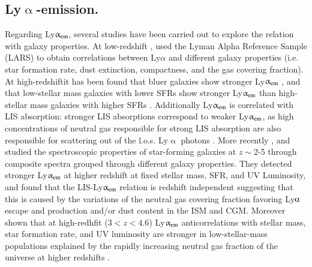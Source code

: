 \documentclass[longauth]{aa}
\begin{document}
\subsection{Ly$\upalpha$-emission.}

Regarding Ly$\upalpha_{\rm{em}}$, several studies have been carried out to
explore the relation with galaxy properties. At low-redshift \cite
{Runnholm20}, used the Lyman Alpha Reference Sample (LARS) to obtain
correlations between Ly$\alpha$ and different galaxy properties (i.e. star
formation rate, dust extinction, compactness, and the gas covering fraction).
At high-redshiftit has been found that bluer galaxies show stronger
Ly$\upalpha_{\rm{em}}$
\citep{Shapley03,Pentericci10,Berry12,Erb16}, and that low-stellar mass
galaxies with lower SFRs show stronger Ly$\upalpha_{\rm{em}}$ than
high-stellar mass galaxies with higher SFRs \citep
{Vanzella09,Stark10,Erb06a,Jones12,Shapley03,Kornei10,Hathi16}. Additionally
Ly$\upalpha_{\rm{em}}$ is correlated with LIS absorption: stronger LIS
absorptions correspond to weaker Ly$\upalpha_{\rm{em}}$, as high
concentrations of neutral gas responsible for strong LIS absorption are also
responsible for scattering out of the l.o.s. Ly$\upalpha$ photons \citep
{Shapley03,Vanzella09,Jones12}. More recently \cite{Du18},
\citep{Trainor19} and \cite{Pahl20} studied the spectroscopic properties of
star-forming galaxies at $z\sim$2-5 through composite spectra grouped
through different galaxy properties. They detected stronger Ly$\upalpha_{\rm
{em}}$ at higher redshift at fixed stellar mass, SFR, and UV Luminosity, and
found that the LIS-Ly$\upalpha_{\rm{em}}$ relation is redshift independent
suggesting that this is caused by the variations of the neutral gas covering
fraction favoring Ly$\alphaup$ escape and production and/or dust content in
the ISM and CGM. Moreover \cite{Oyarzun16,Oyarzun17} shown that at
high-redhfit ($3<z<4.6$) Ly$\upalpha_{\rm{em}}$ anticorrelations with
stellar mass, star formation rate, and UV luminosity are stronger in
low-stellar-mass populations explained by the rapidly increasing neutral gas
fraction of the universe at higher redshifts \citep{Du21}.

\end{document}
